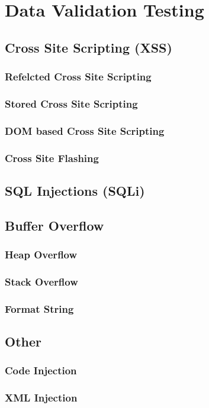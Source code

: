 \chapter{Data Validation Testing}

\section{Cross Site Scripting (XSS)}

	\subsection{Refelcted Cross Site Scripting}

	\subsection{Stored Cross Site Scripting}

	\subsection{DOM based Cross Site Scripting}

	\subsection{Cross Site Flashing}

\section{SQL Injections (SQLi)}
	


\section{Buffer Overflow}

	\subsection{Heap Overflow}

	\subsection{Stack Overflow}

	\subsection{Format String}

\section{Other}

	\subsection{Code Injection}

	\subsection{XML Injection}


